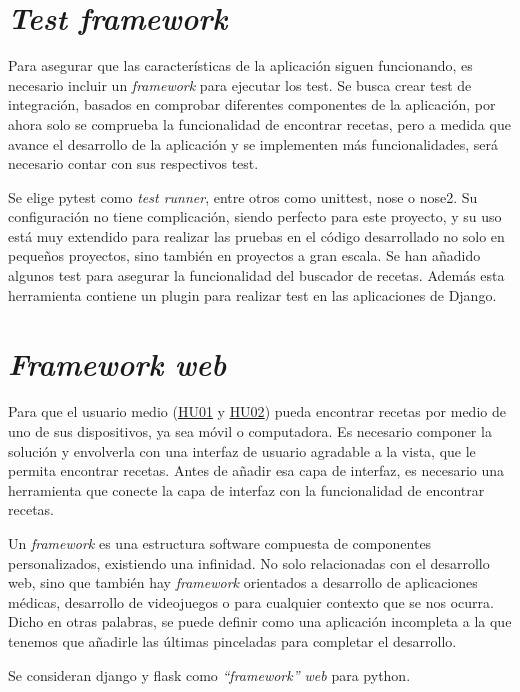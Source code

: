 \section{\emph{Test framework}}
Para asegurar que las características de la aplicación siguen funcionando, es necesario incluir un \emph{\gls{framework}} para ejecutar los test. Se busca crear test de integración, basados en comprobar diferentes componentes de la aplicación, por ahora solo se comprueba la funcionalidad de encontrar recetas, pero a medida que avance el desarrollo de la aplicación y se implementen más funcionalidades, será necesario contar con sus respectivos test.

Se elige pytest como \emph{test runner}, entre otros como unittest, nose o nose2. Su configuración no tiene complicación, siendo perfecto para este proyecto, y su uso está muy extendido para realizar las pruebas en el código desarrollado no solo en pequeños proyectos, sino también en proyectos a gran escala. Se han añadido algunos test para asegurar la funcionalidad del buscador de recetas. Además esta herramienta contiene un plugin para realizar test en las aplicaciones de Django.

\section{\emph{Framework web}}
Para que el usuario medio (\href{https://github.com/Slowmybrosh/TFG-DietPlanner/issues/22}{HU01} y \href{https://github.com/Slowmybrosh/TFG-DietPlanner/issues/41}{HU02}) pueda encontrar recetas por medio de uno de sus dispositivos, ya sea móvil o computadora. Es necesario componer la solución y envolverla con una interfaz de usuario agradable a la vista, que le permita encontrar recetas. Antes de añadir esa capa de interfaz, es necesario una herramienta que conecte la capa de interfaz con la funcionalidad de encontrar recetas. 

Un \emph{\gls{framework}} es una estructura software compuesta de componentes personalizados, existiendo una infinidad. No solo relacionadas con el desarrollo web, sino que también hay \emph{\gls{framework}} orientados a desarrollo de aplicaciones médicas, desarrollo de videojuegos o para cualquier contexto que se nos ocurra. Dicho en otras palabras, se puede definir como una aplicación incompleta a la que tenemos que añadirle las últimas pinceladas para completar el desarrollo. 

Se consideran \Gls{django} y \Gls{flask} como \emph{``framework'' web} para \Gls{python}.

